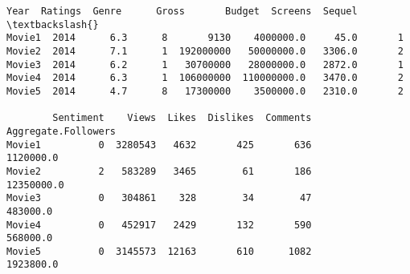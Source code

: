             \begin{tcolorbox}[breakable, size=fbox, boxrule=.5pt, pad at break*=1mm, opacityfill=0]
\begin{Verbatim}[commandchars=\\\{\}]
        Year  Ratings  Genre      Gross       Budget  Screens  Sequel  \textbackslash{}
Movie1  2014      6.3      8       9130    4000000.0     45.0       1
Movie2  2014      7.1      1  192000000   50000000.0   3306.0       2
Movie3  2014      6.2      1   30700000   28000000.0   2872.0       1
Movie4  2014      6.3      1  106000000  110000000.0   3470.0       2
Movie5  2014      4.7      8   17300000    3500000.0   2310.0       2

        Sentiment    Views  Likes  Dislikes  Comments  Aggregate.Followers
Movie1          0  3280543   4632       425       636            1120000.0
Movie2          2   583289   3465        61       186           12350000.0
Movie3          0   304861    328        34        47             483000.0
Movie4          0   452917   2429       132       590             568000.0
Movie5          0  3145573  12163       610      1082            1923800.0
\end{Verbatim}
\end{tcolorbox}
